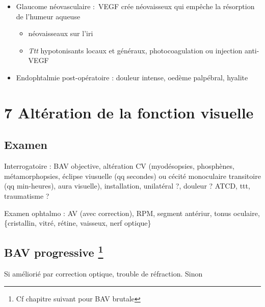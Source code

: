 \documentclass[11pt]{article}
\begin{document}
\begin{itemize}
\begin{itemize}
\item signes fonctionnels .: douleurs profondes++ irradiant dans trijumeau,
souvent nausées, vomissement, BAV
\item examen : douleurs intenses, oeil rouge, transparence cornée \dec diffuse,
semi-mydriase aréflexique, angle iridocornéen fermé, hypertonie oculaire++
\item cécité en qq jours sans ttt \danger
\item \emph{ttt} = urgence \skull : antalgique, inhibiteurs de l'anhydrase
carbonique \footnote{\dec production d'humeur aqueuse.}, solutés hyperosmolaires\footnote{Déshydratation du vitré}, collyre hypotonisants,
collyres myotiques
\item post-crise : iridotomie périphérique sur \textbf{les deux yeux} (laser ou chir)
\end{itemize}
\item Glaucome néovasculaire : VEGF crée néovaisseux qui empêche la résorption de
l'humeur aqueuse
\begin{itemize}
\item néovaisseaux sur l'iri
\item \emph{Ttt} hypotonisants locaux et généraux, photocoagulation ou injection anti-VEGF
\end{itemize}
\item Endophtalmie post-opératoire : douleur intense, oedème palpébral, hyalite
\end{itemize}
\section{7 Altération de la fonction visuelle}
\label{sec:orgf68a659}
\subsection{Examen}
\label{sec:orgf93cf35}
Interrogatoire : BAV objective, altération CV  (myodésopsies, phosphènes,
métamorphopsies, éclipse viusuelle (qq secondes) ou cécité monoculaire
transitoire (qq min-heures), aura visuelle), installation, unilatéral ?, douleur
? ATCD, ttt, traumatisme ?

Examen ophtalmo : AV (avec correction), RPM, segment antériur, tonus oculaire,
\{cristallin, vitré, rétine, vaisseux, nerf optique\}

\subsection{BAV progressive \footnote{Cf chapitre suivant pour BAV brutale}}
\label{sec:orgeeb31dc}
Si améliorié par correction optique, trouble de réfraction. Sinon 
\end{document}
